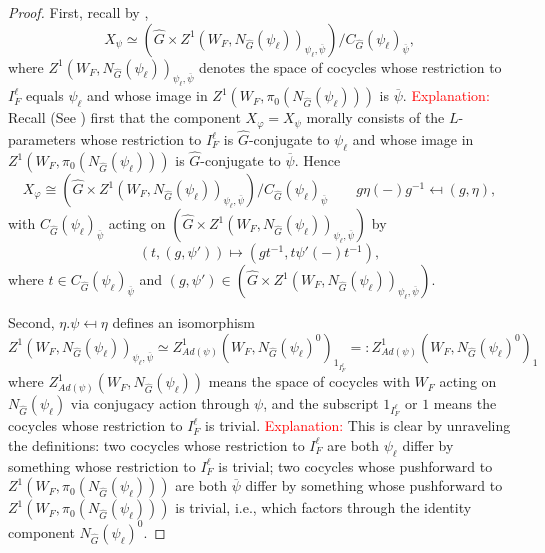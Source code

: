 \begin{theorem}
    \begin{proof}
    	First, recall by \cite[Subsection 4.6]{dat2022ihes},
    	$$X_{\psi} \simeq \left(\hat{G} \times Z^1(W_F, N_{\hat{G}}(\psi_{\ell}))_{\psi_{\ell}, \overline{\psi}}\right)/C_{\hat{G}}(\psi_{\ell})_{\overline{\psi}},$$
    	where $Z^1(W_F, N_{\hat{G}}(\psi_{\ell}))_{\psi_{\ell}, \overline{\psi}}$  denotes the space of cocycles whose restriction to $I_F^{\ell}$ equals $\psi_{\ell}$ and whose image in $Z^1(W_F, \pi_0(N_{\hat{G}}(\psi_{\ell})))$ is $\overline{\psi}$. 
    	\textcolor{red}{Explanation:} Recall (See \cite[Subsection 4.6]{dat2022ihes}) first that the component $X_{\varphi}=X_{\psi}$ morally consists of the $L$-parameters whose restriction to $I_F^{\ell}$ is $\hat{G}$-conjugate to $\psi_{\ell}$ and whose image in $Z^1(W_F, \pi_0(N_{\hat{G}}(\psi_{\ell})))$ is $\hat{G}$-conjugate to $\overline{\psi}$. Hence 
    	$$X_{\varphi} \cong (\hat{G} \times Z^1(W_F, N_{\hat{G}}(\psi_{\ell}))_{\psi_{\ell}, \overline{\psi}})/C_{\hat{G}}(\psi_{\ell})_{\overline{\psi}} \qquad g\eta(-)g^{-1} \mapsfrom (g, \eta),$$
    	with $C_{\hat{G}}(\psi_{\ell})_{\overline{\psi}}$ acting on $(\hat{G} \times Z^1(W_F, N_{\hat{G}}(\psi_{\ell}))_{\psi_{\ell}, \overline{\psi}})$ by 
    	$$(t, (g, \psi')) \mapsto (gt^{-1}, t\psi'(-)t^{-1}),$$
    	where $t \in C_{\hat{G}}(\psi_{\ell})_{\overline{\psi}}$ and $(g, \psi') \in (\hat{G} \times Z^1(W_F, N_{\hat{G}}(\psi_{\ell}))_{\psi_{\ell}, \overline{\psi}})$.
    	
    	Second, $\eta.\psi \mapsfrom \eta$ defines an isomorphism
    	$$Z^1(W_F, N_{\hat{G}}(\psi_{\ell}))_{\psi_{\ell}, \overline{\psi}} \simeq Z^1_{Ad(\psi)}(W_F, N_{\hat{G}}(\psi_{\ell})^0)_{1_{I_F^{\ell}}}=:Z^1_{Ad(\psi)}(W_F, N_{\hat{G}}(\psi_{\ell})^0)_1$$
    	where $Z^1_{Ad(\psi)}(W_F, N_{\hat{G}}(\psi_{\ell}))$ means the space of cocycles with $W_F$ acting on $N_{\hat{G}}(\psi_{\ell})$ via conjugacy action through $\psi$, and the subscript $1_{I_F^{\ell}}$ or $1$ means the cocycles whose restriction to $I_F^{\ell}$ is trivial. 
    	\textcolor{red}{Explanation:} This is clear by unraveling the definitions: two cocycles whose restriction to $I_F^\ell$ are both $\psi_{\ell}$ differ by something whose restriction to $I_F^{\ell}$ is trivial; two cocycles whose pushforward to $Z^1(W_F, \pi_0(N_{\hat{G}}(\psi_{\ell})))$ are both $\overline{\psi}$ differ by something whose pushforward to $Z^1(W_F, \pi_0(N_{\hat{G}}(\psi_{\ell})))$ is trivial, i.e., which factors through the identity component $N_{\hat{G}}(\psi_{\ell})^0$.
    	

\end{proof}
\end{theorem}

